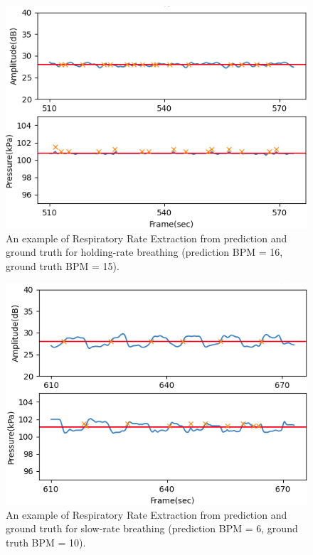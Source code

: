 \documentclass[10pt,letterpaper]{article}
\begin{document}
\begin{figure}[htbp]
	\centerline{\includegraphics[width=120mm,scale=0.9]{PD2GT_HOLD01.png}}
	\caption{An example of Respiratory Rate Extraction from prediction and ground truth for holding-rate breathing (prediction BPM = 16, ground truth BPM = 15).}
	\label{fig:RREXT_HOLD}
\end{figure}
\begin{figure}[htbp]
	\centerline{\includegraphics[width=120mm,scale=0.9]{PD2GT_SLOW01.png}}
	\caption{An example of Respiratory Rate Extraction from prediction and ground truth for slow-rate breathing (prediction BPM = 6, ground truth BPM = 10).}
	\label{fig:RREXT_SLOW}
\end{figure}
	
	

	

	

	
\end{document}
